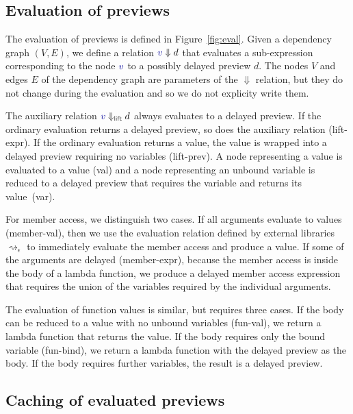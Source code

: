 \documentclass[acmsmall,anonymous,fleqn]{acmart}\settopmatter{printfolios=false,printccs=false,printacmref=false}
\theoremstyle{plain}
\theoremstyle{definition}
\newcommand{\ident}[1]{\textnormal{\textcolor{idclr}{\sffamily #1}}}
\newcommand{\bndclr}[1]{\textcolor{kvdclr}{#1}}
\newcommand{\rname}[1]{{\sffamily\small(#1)}}
\begin{document}

\subsection{Evaluation of previews}
The evaluation of previews is defined in Figure~\ref{fig:eval}. Given a dependency graph $(V, E)$,
we define a relation $\bndclr{v}\Downarrow d$ that evaluates a sub-expression corresponding to
the node $\bndclr{v}$ to a possibly delayed preview $d$. The nodes $V$ and edges $E$ of the
dependency graph are parameters of the $\Downarrow$ relation, but they do not change during the
evaluation and so we do not explicity write them.

The auxiliary relation $\bndclr{v}\Downarrow_{\ident{lift}} d$ always evaluates
to a delayed preview. If the ordinary evaluation returns a delayed preview, so does the auxiliary
relation \rname{lift-expr}. If the ordinary evaluation returns a value, the value is wrapped
into a delayed preview requiring no variables \rname{lift-prev}.
%
A node representing a value is evaluated to a value \rname{val} and a node representing
an unbound variable is reduced to a delayed preview that requires the variable and returns its
value~\rname{var}.

For member access, we distinguish two cases. If all arguments evaluate to values \rname{member-val},
then we use the evaluation relation defined by external libraries $\rightsquigarrow_\epsilon$ to
immediately evaluate the member access and produce a value. If some of the arguments are
delayed \rname{member-expr}, because the member access is inside the body of a lambda function,
we produce a delayed member access expression that requires the union of the variables
required by the individual arguments.

The evaluation of function values is similar, but requires three cases. If the body can
be reduced to a value with no unbound variables \rname{fun-val}, we return a lambda function that
returns the value. If the body requires only the bound variable \rname{fun-bind}, we return a
lambda function with the delayed preview as the body. If the body requires further variables,
the result is a delayed preview.

\subsection{Caching of evaluated previews}
\label{sec:previews-cache}
\end{document}
